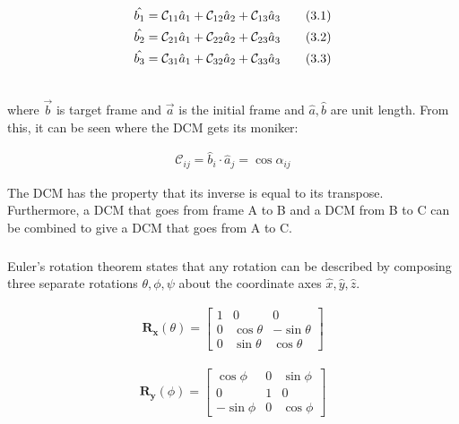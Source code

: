 \documentclass{article}
\begin{document}
\begin{align}
    \hat{b_{1}} = \mathcal{C}_{11} \hat{a}_{1} + \mathcal{C}_{12} \hat{a}_{2} + \mathcal{C}_{13} \hat{a}_{3} \tag{3.1} \\
    \hat{b_{2}} = \mathcal{C}_{21} \hat{a}_{1} + \mathcal{C}_{22} \hat{a}_{2} + \mathcal{C}_{23} \hat{a}_{3} \tag{3.2} \\
    \hat{b_{3}} = \mathcal{C}_{31} \hat{a}_{1} + \mathcal{C}_{32} \hat{a}_{2} + \mathcal{C}_{33} \hat{a}_{3} \tag{3.3} \\ \notag
\end{align}

\noindent where $\Vec{b}$ is target frame and $\Vec{a}$ is the initial frame and $\hat{a}, \hat{b}$ are unit length. From this, it can be seen where the DCM gets its moniker: 

\begin{align}
    \mathcal{C}_{ij} = \hat{b}_{i} \cdot \hat{a}_{j} = \cos \alpha_{ij} \tag{3.4}
\end{align}

The DCM has the property that its inverse is equal to its transpose. Furthermore, a DCM that goes from frame A to B and a DCM from B to C can be combined to give a DCM that goes from A to C. 

\subsubsection{\color{black}{Euler Angles}}

Euler's rotation theorem states that any rotation can be described by composing three separate rotations $\theta, \phi, \psi$ about the coordinate axes $\hat{x}, \hat{y}, \hat{z}$. 

\begin{align}
    \mathbf{R_x}(\theta) = \begin{bmatrix}
        1 & 0 & 0 \\
        0 & \cos \theta & -\sin \theta \\
        0 & \sin \theta & \cos \theta
    \end{bmatrix} \tag{3.5}
\end{align}

\begin{align}
    \mathbf{R_y}(\phi) = \begin{bmatrix}
        \cos \phi & 0 & \sin \phi \\
        0 & 1 & 0 \\
        -\sin \phi & 0 & \cos \phi
    \end{bmatrix} \tag{3.6}
\end{align}
\end{document}
